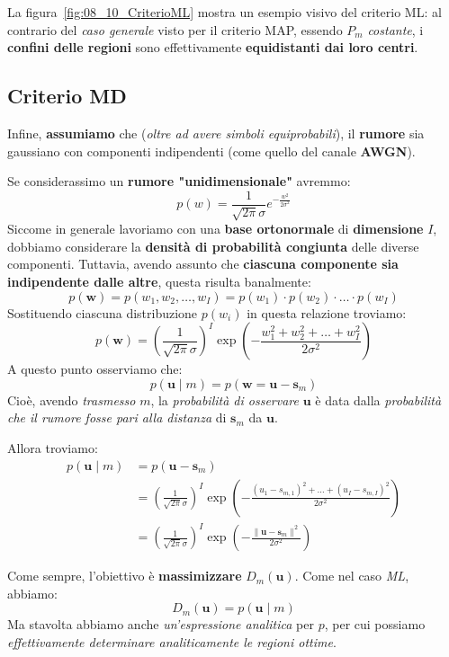 La figura~\ref{fig:08_10_CriterioML} mostra un esempio visivo del criterio ML: al contrario del 
\textit{caso generale} visto per il criterio MAP, essendo $P_m$ \textit{costante}, i 
\textbf{confini delle regioni} sono effettivamente \textbf{equidistanti dai loro centri}.

\subsection{Criterio MD}

Infine, \textbf{assumiamo} che (\textit{oltre ad avere simboli equiprobabili}), il \textbf{rumore} 
sia gaussiano con componenti indipendenti (come quello del canale \textbf{AWGN}).

Se considerassimo un \textbf{rumore "unidimensionale"} avremmo:
\[
    p(w) = \frac{1}{\sqrt{2\pi} \sigma} e^{- \frac{w^2}{2 \sigma^2}}
\]
Siccome in generale lavoriamo con una \textbf{base ortonormale} di \textbf{dimensione} $I$, 
dobbiamo considerare la \textbf{densità di probabilità congiunta} delle diverse
componenti. Tuttavia, avendo assunto che \textbf{ciascuna componente sia indipendente dalle altre},
questa risulta banalmente:
\[
    p(\mathbf{w}) = p(w_{1},w_{2},\ldots , w_I) = p(w_{1})\cdot p(w_{2}) \cdot \ldots \cdot p(w_I)
\]
Sostituendo ciascuna distribuzione $p(w_i)$ in questa relazione troviamo:
\[
    p(\mathbf{w}) = \left( \frac{1}{\sqrt{2\pi} \sigma} \right)^I 
    \exp \left( - \frac{w_{1}^2 + w_{2}^2 + \ldots  + w_I^2}{2 \sigma^2} \right)
\]
A questo punto osserviamo che:
\[
    p(\mathbf{u} \;|\; m ) = p(\mathbf{w} = \mathbf{u} - \mathbf{s}_m)
\]
Cioè, avendo \textit{trasmesso} $m$, la \textit{probabilità di osservare} $\mathbf{u}$ è
data dalla \textit{probabilità che il rumore fosse pari alla distanza} di $\mathbf{s}_m$
da $\mathbf{u}$.

Allora troviamo:
\[
    \begin{aligned}
        p(\mathbf{u} \;|\; m ) &= p(\mathbf{u} - \mathbf{s}_m) \\  
                               &= \left( \frac{1}{\sqrt{2\pi} \sigma} \right)^I 
        \exp \left( - \frac{(u_{1} - s_{m,1})^2 + \ldots + (u_I - s_{m,I})^2 }{2 \sigma^2} \right) \\ 
                               &= \left( \frac{1}{\sqrt{2\pi} \sigma} \right)^I
        \exp \left( - \frac{\| \mathbf{u} - \mathbf{s}_m \|^2}{2 \sigma^2} \right)
    \end{aligned}
\]

Come sempre, l'obiettivo è \textbf{massimizzare} $D_m(\mathbf{u})$.
Come nel caso \textit{ML}, abbiamo:
\[
    D_m(\mathbf{u}) = p(\mathbf{u}\;|\; m)
\]
Ma stavolta abbiamo anche \textit{un'espressione analitica} per $p$, per cui
possiamo \textit{effettivamente determinare analiticamente le regioni ottime}.

